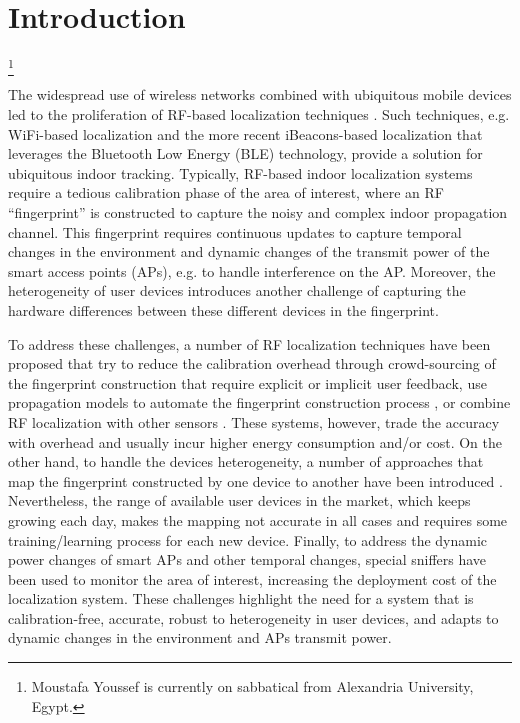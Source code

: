 \documentclass[conference]{IEEEtran}
\newcommand\blfootnote[1]{\begingroup
  \renewcommand\thefootnote{}\footnote{#1}\addtocounter{footnote}{-1}\endgroup
}
\begin{document}
\IEEEpeerreviewmaketitle

\section{Introduction}
\blfootnote{Moustafa Youssef is currently on sabbatical from Alexandria University, Egypt.}
The widespread use of wireless networks combined with ubiquitous mobile devices led to the proliferation of RF-based localization techniques \cite{ips_vision,youssef2005multivariate,el2010propagation,abdel2013monophy,sabek2012multi,youssef2006location,ibrahim2011hidden,kosba2009analysis,saeed2014ichnaea}. Such techniques, e.g. WiFi-based localization and the more recent iBeacons-based localization that leverages the Bluetooth Low Energy (BLE) technology, provide a solution for ubiquitous indoor tracking. Typically, RF-based indoor localization systems require a tedious calibration phase of the area of interest, where an RF ``fingerprint'' is constructed to capture the noisy and complex indoor propagation channel. This fingerprint requires continuous updates to capture temporal changes in the environment and dynamic changes of the transmit power of the smart access points (APs), e.g. to handle interference 
on the AP. Moreover, the heterogeneity of user devices introduces another challenge of capturing the hardware differences between these different devices in the fingerprint.

To address these challenges, a number of RF localization techniques have been proposed that try to reduce the calibration overhead through crowd-sourcing of the fingerprint construction that require explicit \cite{organic} or implicit \cite{abdelnassersemanticslam,wang2012no,rai2012zee} user feedback, use propagation models to automate the fingerprint construction process \cite{aroma,RADAR00,ARIADNE}, or combine RF localization with other sensors \cite{abdelnassersemanticslam,wang2012no}. These systems, however, trade the accuracy with overhead and usually incur higher energy consumption and/or cost. On the other hand, to handle the devices heterogeneity, a number of approaches that map the fingerprint constructed by one device to another have been introduced \cite{het5,het2,het3,het4}. Nevertheless, the range of available user devices in the market, which keeps growing each day, makes the mapping not accurate in all cases and requires some training/learning process for each new device. Finally, to address the dynamic power changes of smart APs and other temporal changes, special sniffers have been used \cite{lease} to monitor the area of interest, increasing the deployment cost of the localization system. These challenges highlight the need for a system that is calibration-free, accurate, robust to heterogeneity in user devices, and adapts to dynamic changes in the environment and APs transmit power.
\end{document}
